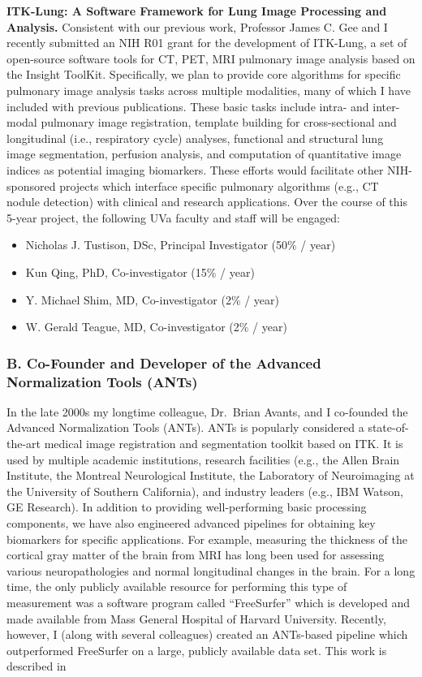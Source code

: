 \documentclass[11pt,]{article}
\providecommand{\tightlist}{%
  \setlength{\itemsep}{0pt}\setlength{\parskip}{0pt}}
\begin{document}
\textbf{ITK-Lung: A Software Framework for Lung Image Processing and
Analysis.} Consistent with our previous work, Professor James C. Gee and
I recently submitted an NIH R01 grant for the development of ITK-Lung, a
set of open-source software tools for CT, PET, MRI pulmonary image
analysis based on the Insight ToolKit. Specifically, we plan to provide
core algorithms for specific pulmonary image analysis tasks across
multiple modalities, many of which I have included with previous
publications. These basic tasks include intra- and inter-modal pulmonary
image registration, template building for cross-sectional and
longitudinal (i.e., respiratory cycle) analyses, functional and
structural lung image segmentation, perfusion analysis, and computation
of quantitative image indices as potential imaging biomarkers. These
efforts would facilitate other NIH-sponsored projects which interface
specific pulmonary algorithms (e.g., CT nodule detection) with clinical
and research applications. Over the course of this 5-year project, the
following UVa faculty and staff will be engaged:

\begin{itemize}
\tightlist
\item
  Nicholas J. Tustison, DSc, Principal Investigator (50\% / year)
\item
  Kun Qing, PhD, Co-investigator (15\% / year)
\item
  Y. Michael Shim, MD, Co-investigator (2\% / year)
\item
  W. Gerald Teague, MD, Co-investigator (2\% / year)
\end{itemize}

\subsubsection{B. Co-Founder and Developer of the Advanced Normalization
Tools
(ANTs)}\label{b.-co-founder-and-developer-of-the-advanced-normalization-tools-ants}

In the late 2000s my longtime colleague, Dr.~Brian Avants, and I
co-founded the Advanced Normalization Tools (ANTs). ANTs is popularly
considered a state-of-the-art medical image registration and
segmentation toolkit based on ITK. It is used by multiple academic
institutions, research facilities (e.g., the Allen Brain Institute, the
Montreal Neurological Institute, the Laboratory of Neuroimaging at the
University of Southern California), and industry leaders (e.g., IBM
Watson, GE Research). In addition to providing well-performing basic
processing components, we have also engineered advanced pipelines for
obtaining key biomarkers for specific applications. For example,
measuring the thickness of the cortical gray matter of the brain from
MRI has long been used for assessing various neuropathologies and normal
longitudinal changes in the brain. For a long time, the only publicly
available resource for performing this type of measurement was a
software program called ``FreeSurfer'' which is developed and made
available from Mass General Hospital of Harvard University. Recently,
however, I (along with several colleagues) created an ANTs-based
pipeline which outperformed FreeSurfer on a large, publicly available
data set. This work is described in
\end{document}
